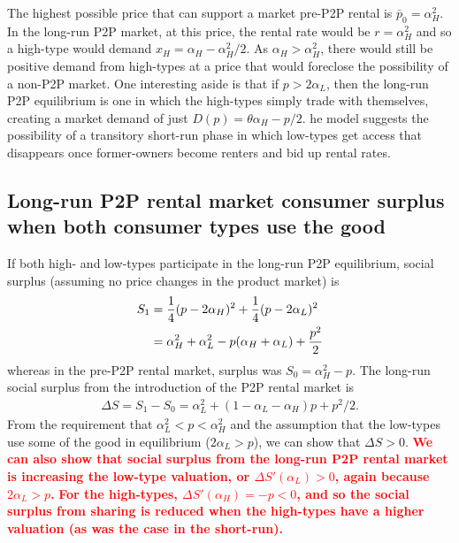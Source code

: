 \documentclass[11pt]{article}
\newcommand{\important}[1]{\textcolor{red}{\textbf{#1}}}
\newcommand{\important}[1]{#1}
\begin{document}
The highest possible price that can support a market pre-P2P rental is $\bar{p}_0 = \alpha_H^2$.  
In the long-run P2P market, at this price, the rental rate would be $r = \alpha_H^2$ and so a high-type would demand $x_H = \alpha_H - \alpha_H^2/2$.
As $\alpha_H > \alpha_H^2$, there would still be positive demand from high-types at a price that would foreclose the possibility of a non-P2P market.  
One interesting aside is that if $p > 2 \alpha_L$, then the long-run P2P equilibrium is one in which the high-types simply trade with themselves, creating a market demand of just $D(p) = \theta \alpha_H - p/2$. 
he model suggests the possibility of a transitory short-run phase in which low-types get access that disappears once former-owners become renters and bid up rental rates. 

\subsection{Long-run P2P rental market consumer surplus when both consumer types use the good} 
If both high- and low-types participate in the long-run P2P equilibrium, social surplus (assuming no price changes in the product market) is 
\begin{align} 
S_1 & = \frac{1}{4}(p - 2\alpha_H)^2 + \frac{1}{4}(p - 2\alpha_L)^2 \notag \\
    & = \alpha_H^2 + \alpha_L^2 - p(\alpha_H + \alpha_L) + \frac{p^2}{2} \notag 
\end{align} 
whereas in the pre-P2P rental market, surplus was $S_0 = \alpha_H^2 - p$.  
The long-run social surplus from the introduction of the P2P rental market is  
\begin{align}
\Delta S = S_1 - S_0 = \alpha_L^2 + (1 - \alpha_L - \alpha_H)p + p^2/2.  
\end{align} 
From the requirement that $\alpha_L^2 < p < \alpha_H^2$ and the assumption that the low-types use some of the good in equilibrium ($2 \alpha_L > p$), we can show that $\Delta S > 0$. 
\important{We can also show that social surplus from the long-run P2P rental market is increasing the low-type valuation, or $\Delta S'(\alpha_L) > 0$, again because $2\alpha_L > p$.}
\important{For the high-types, $\Delta S'(\alpha_H) = -p < 0$, and so the social surplus from sharing is 
reduced when the high-types have a higher valuation (as was the case in the short-run).}
\end{document}
